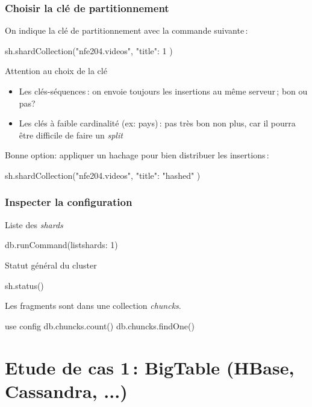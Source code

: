 \begin{frame}[fragile]
\frametitle{Choisir la clé de partitionnement}

On indique la clé de partitionnement avec la commande suivante\,:

\begin{smallverbatim}
sh.shardCollection("nfe204.videos", { "title": 1 } )
\end{smallverbatim}

Attention au choix de la clé

\begin{itemize}
  \item Les clés-séquences\,:  on envoie toujours les insertions au même serveur\,; bon ou pas?
  \item Les clés à faible cardinalité (ex: pays)\,: pas très bon non plus, car 
               il pourra être difficile de faire un \textit{split}
\end{itemize}

Bonne option: appliquer un hachage pour bien distribuer les insertions\,:

\begin{smallverbatim}
sh.shardCollection("nfe204.videos", { "title": "hashed" } )
\end{smallverbatim}

\end{frame}


\begin{frame}[fragile]
\frametitle{Inspecter la configuration}

Liste des \textit{shards}
\begin{smallverbatim}
db.runCommand({listshards: 1})
\end{smallverbatim}

Statut général du cluster
\begin{smallverbatim}
sh.status()
\end{smallverbatim}

Les fragments sont dans une collection \textit{chuncks}.

\begin{smallverbatim}
use config
db.chuncks.count()
db.chuncks.findOne()
\end{smallverbatim}
\end{frame}


\section{Etude de cas 1\,: BigTable (HBase, Cassandra, ...)}

